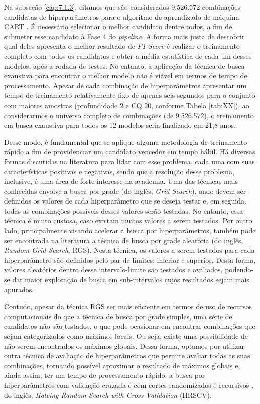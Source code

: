 Na subseção \ref{cap:7.1.3}, citamos que são considerados 9.526.572 combinações candidatas de hiperparâmetros para o algoritmo de aprendizado de máquina CART \cite{bib:livroCART}. É necessário selecionar o melhor candidato dentre todos, a fim de submeter esse candidato à Fase 4 do \textit{pipeline}. A forma mais justa de descobrir qual deles apresenta o melhor resultado de \textit{F1-Score} é realizar o treinamento completo com todos os candidatos e obter a média estatística de cada um desses modelos, após a rodada de testes. No entanto, a aplicação da técnica de busca exaustiva para encontrar o melhor modelo não é viável em termos de tempo de processamento. Apesar de cada combinação de hiperparâmetros apresentar um tempo de treinamento relativamente fixo de apenas seis segundos para o conjunto com maiores amostras (profundidade 2 e CQ 20, conforme Tabela \ref{tab:XX}), ao considerarmos o universo completo de combinações (de 9.526.572), o treinamento em busca exaustiva para todos os 12 modelos seria finalizado em 21,8 anos.

Desse modo, é fundamental que se aplique alguma metodologia de treinamento rápido a fim de providenciar um candidato vencedor em tempo hábil. Há diversas formas discutidas na literatura para lidar com esse problema, cada uma com suas características positivas e negativas, sendo que a resolução desse problema, inclusive, é uma área de forte interesse na academia. Uma das técnicas mais conhecidas envolve a busca por grade \cite{bib:randomsearch} (do inglês, \textit{Grid Search}), onde devem ser definidos os valores de cada hiperparâmetro que se deseja testar e, em seguida, todas as combinações possíveis desses valores serão testadas. No entanto, essa técnica é muito custosa, caso existam muitos valores a serem testados. Por outro lado, principalmente visando acelerar a busca por hiperparâmetros, também pode ser encontrada na literatura a técnica de busca por grade aleatória (do inglês, \textit{Random Grid Search}, RGS). Nesta técnica, os valores a serem testados para cada hiperparâmetro são definidos pelo par de limites: inferior e superior. Desta forma, valores aleatórios dentro desse intervalo-limite são testados e avaliados, podendo-se dar maior exploração de busca em sub-intervalos cujos resultados sejam mais apurados.

Contudo, apesar da técnica RGS ser mais eficiente em termos de uso de recursos computacionais do que a técnica de busca por grade simples, uma série de candidatos não são testados, o que pode ocasionar em encontrar combinações que sejam categorizados como máximos locais. Ou seja, existe uma possibilidade de não serem encontrados os máximos globais. Dessa forma, optamos por utilizar outra técnica de avaliação de hiperparâmetros que permite avaliar todas as suas combinações, tornando possível aproximar o resultado de máximos globais e, ainda assim, ter um tempo de processamento rápido: a busca por hiperparâmetros com validação cruzada e com cortes randomizados e recursivos \cite{bib:halvingrandomsearch}, do inglês, \textit{Halving Random Search with Cross Validation} (HRSCV).

